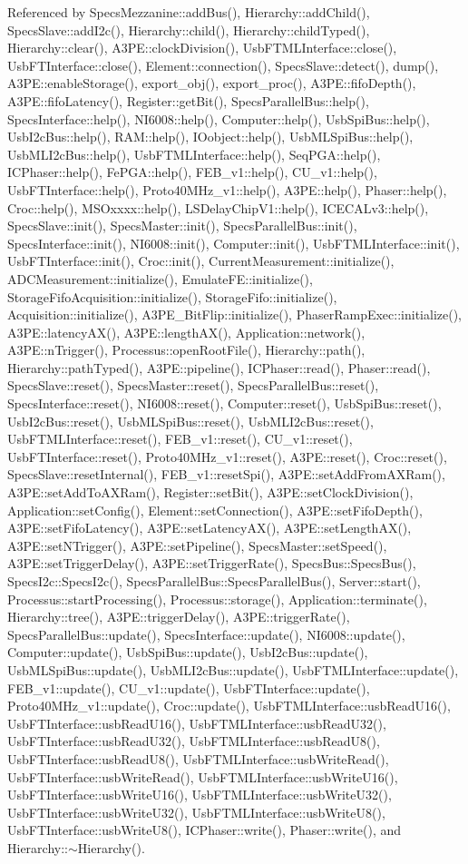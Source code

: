 Referenced by SpecsMezzanine::addBus(), Hierarchy::addChild(), SpecsSlave::addI2c(), Hierarchy::child(), Hierarchy::childTyped(), Hierarchy::clear(), A3PE::clockDivision(), UsbFTMLInterface::close(), UsbFTInterface::close(), Element::connection(), SpecsSlave::detect(), dump(), A3PE::enableStorage(), export\_\-obj(), export\_\-proc(), A3PE::fifoDepth(), A3PE::fifoLatency(), Register::getBit(), SpecsParallelBus::help(), SpecsInterface::help(), NI6008::help(), Computer::help(), UsbSpiBus::help(), UsbI2cBus::help(), RAM::help(), IOobject::help(), UsbMLSpiBus::help(), UsbMLI2cBus::help(), UsbFTMLInterface::help(), SeqPGA::help(), ICPhaser::help(), FePGA::help(), FEB\_\-v1::help(), CU\_\-v1::help(), UsbFTInterface::help(), Proto40MHz\_\-v1::help(), A3PE::help(), Phaser::help(), Croc::help(), MSOxxxx::help(), LSDelayChipV1::help(), ICECALv3::help(), SpecsSlave::init(), SpecsMaster::init(), SpecsParallelBus::init(), SpecsInterface::init(), NI6008::init(), Computer::init(), UsbFTMLInterface::init(), UsbFTInterface::init(), Croc::init(), CurrentMeasurement::initialize(), ADCMeasurement::initialize(), EmulateFE::initialize(), StorageFifoAcquisition::initialize(), StorageFifo::initialize(), Acquisition::initialize(), A3PE\_\-BitFlip::initialize(), PhaserRampExec::initialize(), A3PE::latencyAX(), A3PE::lengthAX(), Application::network(), A3PE::nTrigger(), Processus::openRootFile(), Hierarchy::path(), Hierarchy::pathTyped(), A3PE::pipeline(), ICPhaser::read(), Phaser::read(), SpecsSlave::reset(), SpecsMaster::reset(), SpecsParallelBus::reset(), SpecsInterface::reset(), NI6008::reset(), Computer::reset(), UsbSpiBus::reset(), UsbI2cBus::reset(), UsbMLSpiBus::reset(), UsbMLI2cBus::reset(), UsbFTMLInterface::reset(), FEB\_\-v1::reset(), CU\_\-v1::reset(), UsbFTInterface::reset(), Proto40MHz\_\-v1::reset(), A3PE::reset(), Croc::reset(), SpecsSlave::resetInternal(), FEB\_\-v1::resetSpi(), A3PE::setAddFromAXRam(), A3PE::setAddToAXRam(), Register::setBit(), A3PE::setClockDivision(), Application::setConfig(), Element::setConnection(), A3PE::setFifoDepth(), A3PE::setFifoLatency(), A3PE::setLatencyAX(), A3PE::setLengthAX(), A3PE::setNTrigger(), A3PE::setPipeline(), SpecsMaster::setSpeed(), A3PE::setTriggerDelay(), A3PE::setTriggerRate(), SpecsBus::SpecsBus(), SpecsI2c::SpecsI2c(), SpecsParallelBus::SpecsParallelBus(), Server::start(), Processus::startProcessing(), Processus::storage(), Application::terminate(), Hierarchy::tree(), A3PE::triggerDelay(), A3PE::triggerRate(), SpecsParallelBus::update(), SpecsInterface::update(), NI6008::update(), Computer::update(), UsbSpiBus::update(), UsbI2cBus::update(), UsbMLSpiBus::update(), UsbMLI2cBus::update(), UsbFTMLInterface::update(), FEB\_\-v1::update(), CU\_\-v1::update(), UsbFTInterface::update(), Proto40MHz\_\-v1::update(), Croc::update(), UsbFTMLInterface::usbReadU16(), UsbFTInterface::usbReadU16(), UsbFTMLInterface::usbReadU32(), UsbFTInterface::usbReadU32(), UsbFTMLInterface::usbReadU8(), UsbFTInterface::usbReadU8(), UsbFTMLInterface::usbWriteRead(), UsbFTInterface::usbWriteRead(), UsbFTMLInterface::usbWriteU16(), UsbFTInterface::usbWriteU16(), UsbFTMLInterface::usbWriteU32(), UsbFTInterface::usbWriteU32(), UsbFTMLInterface::usbWriteU8(), UsbFTInterface::usbWriteU8(), ICPhaser::write(), Phaser::write(), and Hierarchy::$\sim$Hierarchy().


